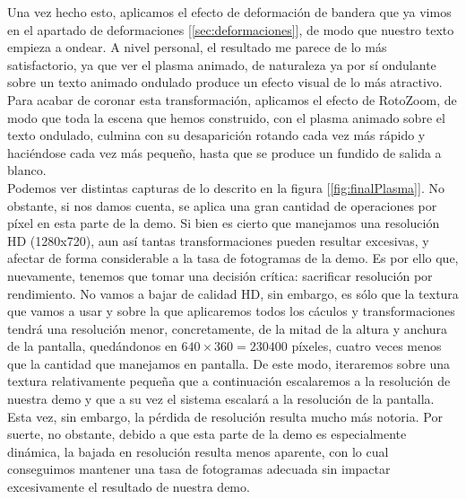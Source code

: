 Una vez hecho esto, aplicamos el efecto de deformación de bandera que ya vimos en el apartado de deformaciones [\ref{sec:deformaciones}], de modo que nuestro texto empieza a ondear. A nivel personal, el resultado me parece de lo más satisfactorio, ya que ver el plasma animado, de naturaleza ya por sí ondulante sobre un texto animado ondulado produce un efecto visual de lo más atractivo. Para acabar de coronar esta transformación, aplicamos el efecto de RotoZoom, de modo que toda la escena que hemos construido, con el plasma animado sobre el texto ondulado, culmina con su desaparición rotando cada vez más rápido y haciéndose cada vez más pequeño, hasta que se produce un fundido de salida a blanco.\\ 

Podemos ver distintas capturas de lo descrito en la figura [\ref{fig:finalPlasma}]. No obstante, si nos damos cuenta, se aplica una gran cantidad de operaciones por píxel en esta parte de la demo. Si bien es cierto que manejamos una resolución HD (1280x720), aun así tantas transformaciones pueden resultar excesivas, y afectar de forma considerable a la tasa de fotogramas de la demo. Es por ello que, nuevamente, tenemos que tomar una decisión crítica: sacrificar resolución por rendimiento. No vamos a bajar de calidad HD, sin embargo, es sólo que la textura que vamos a usar y sobre la que aplicaremos todos los cáculos y transformaciones tendrá una resolución menor, concretamente, de la mitad de la altura y anchura de la pantalla, quedándonos en \(640 \times 360 = 230400\) píxeles, cuatro veces menos que la cantidad que manejamos en pantalla. De este modo, iteraremos sobre una textura relativamente pequeña que a continuación escalaremos a la resolución de nuestra demo y que a su vez el sistema escalará a la resolución de la pantalla.\\

Esta vez, sin embargo, la pérdida de resolución resulta mucho más notoria. Por suerte, no obstante, debido a que esta parte de la demo es especialmente dinámica, la bajada en resolución resulta menos aparente, con lo cual conseguimos mantener una tasa de fotogramas adecuada sin impactar excesivamente el resultado de nuestra demo.\\

